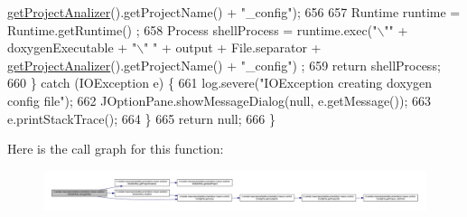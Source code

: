 \begin{DoxyCode}
      \hyperlink{classit_1_1isislab_1_1masonassisteddocumentation_1_1mason_1_1analizer_1_1_global_utility_a78cbdc6022c558d1375a01095ad95659}{getProjectAnalizer}().getProjectName() + \textcolor{stringliteral}{"\_config"});
656             
657             Runtime runtime = Runtime.getRuntime() ;
658             Process shellProcess = runtime.exec(\textcolor{stringliteral}{"\(\backslash\)""} + doxygenExecutable + \textcolor{stringliteral}{"\(\backslash\)" "} + output + File.separator 
      + \hyperlink{classit_1_1isislab_1_1masonassisteddocumentation_1_1mason_1_1analizer_1_1_global_utility_a78cbdc6022c558d1375a01095ad95659}{getProjectAnalizer}().getProjectName() + \textcolor{stringliteral}{"\_config"}) ;
659             \textcolor{keywordflow}{return} shellProcess;
660         \} \textcolor{keywordflow}{catch} (IOException e) \{
661             log.severe(\textcolor{stringliteral}{"IOException creating doxygen config file"});
662             JOptionPane.showMessageDialog(null, e.getMessage());
663             e.printStackTrace();
664         \}
665         \textcolor{keywordflow}{return} null;        
666     \}
\end{DoxyCode}


Here is the call graph for this function\-:\nopagebreak
\begin{figure}[H]
\begin{center}
\leavevmode
\includegraphics[width=350pt]{classit_1_1isislab_1_1masonassisteddocumentation_1_1mason_1_1analizer_1_1_global_utility_a0b0db96cff45244361ff11e4e176b420_cgraph}
\end{center}
\end{figure}


